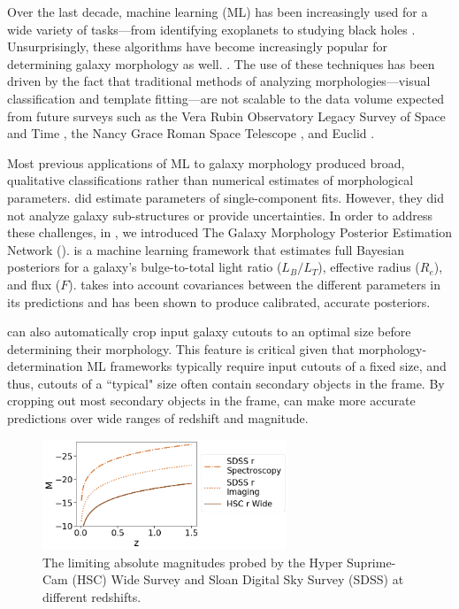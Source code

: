 Over the last decade, machine learning (ML) has been increasingly used for a wide variety of tasks---from identifying exoplanets to studying black holes \citep[e.g.,][]{ml_pz,ml_sz,Shallue2018IdentifyingKepler-90,Sharma2020ApplicationClassification,Natarajan2021QuasarNet:Holes}. Unsurprisingly, these algorithms have become increasingly popular for determining galaxy morphology as well. \citep[e.g.,][]{Dieleman2015Rotation-invariantPrediction, Huertas-Company2015ALEARNING, Tuccillo2018DeepFitting, gamornet_paper, Hausen2020MorpheusData, Walmsley2020GalaxyLearning, Cheng2021GalaxyNetworks, Vega-Ferrero2021PushingSurvey, Tarsitano2022ImageLearning}. The use of these techniques has been driven by the fact that  traditional methods of analyzing morphologies---visual classification and template fitting---are not scalable to the data volume expected from future surveys such as the Vera Rubin Observatory Legacy Survey of Space and Time \citep[LSST;][]{lsst}, the Nancy Grace Roman Space Telescope \citep[NGRST;][]{ngrst}, and Euclid \citep{euclid}. 

Most previous applications of ML to galaxy morphology produced broad, qualitative classifications rather than numerical estimates of morphological parameters. \citet{Tuccillo2018DeepFitting} did estimate parameters of single-component \sersic{} fits. However, they did not analyze galaxy sub-structures or provide uncertainties. In order to address these challenges, in \citet{gampen_software_paper}, we introduced The Galaxy Morphology Posterior Estimation Network (\gampen{}). \gampen{} is a machine learning framework that estimates full Bayesian posteriors for a galaxy's bulge-to-total light ratio ($L_B/L_T$), effective radius ($R_e$), and flux ($F$). \gampen{} takes into account covariances between the different parameters in its predictions and has been shown to produce calibrated, accurate posteriors. 

\gampen{} can also automatically crop input galaxy cutouts to an optimal size before determining their morphology. This feature is critical given that morphology-determination ML frameworks typically require input cutouts of a fixed size, and thus, cutouts of a ``typical" size often contain secondary objects in the frame. By cropping out most secondary objects in the frame, \gampen{} can make more accurate predictions over wide ranges of redshift and magnitude. 

\begin{figure}[htb]
    \centering
    \includegraphics[width = 0.65\textwidth]{hsc_depth.png}
    \caption{The limiting absolute magnitudes probed by the Hyper Suprime-Cam (HSC) Wide Survey and Sloan Digital Sky Survey (SDSS) at different redshifts.}
    \label{fig_c3:hsc_depth}
\end{figure}

